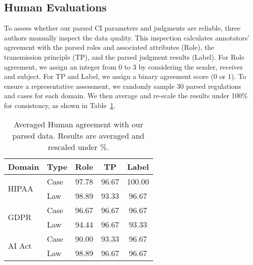


\subsection{Human Evaluations}
\label{subsec:human_eval}
To assess whether our parsed CI parameters and judgments are reliable, three authors manually inspect the data quality.
This inspection calculates annotators' agreement with the parsed roles and associated attributes (Role), the transmission principle (TP), and the parsed judgment results (Label).
For Role agreement, we assign an integer from 0 to 3 by considering the sender, receiver and subject.
For TP and Label, we assign a binary agreement score (0 or 1).
To ensure a representative assessment, we randomly sample 30 parsed regulations and cases for each domain.
We then average and re-scale the results under 100\% for consistency, as shown in Table~\ref{tab:human_eval}.

\begin{table}[h]
\small
    \centering
    \begin{tabular}{l l|ccc}
        \toprule
        \textbf{Domain} & 
        \textbf{Type} &
        \textbf{Role} & \textbf{TP} & \textbf{Label} \\
        \midrule

        \multirow{2}{*}{HIPAA} &
        Case & 97.78 & 96.67
 & 100.00 \\
        & Law & 98.89 & 93.33
 & 96.67
 \\
        \midrule
        \multirow{2}{*}{GDPR} &
        Case & 96.67 & 96.67
 & 96.67\\
        & Law & 94.44 & 96.67
 & 93.33
 \\
        \midrule
        \multirow{2}{*}{AI Act} &
        Case & 90.00 & 93.33 & 96.67 \\
        & Law & 98.89 & 96.67
 & 96.67 \\
        
        \bottomrule
    \end{tabular}
    \vspace{-0.1in}
    \caption{Averaged Human agreement with our parsed data. Results are averaged and rescaled under \%.}  
    \vspace{-0.15in}
    \label{tab:human_eval}
\end{table}

